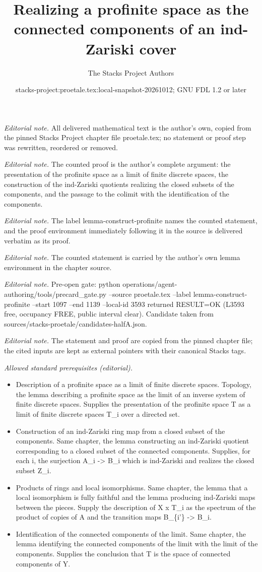\documentclass[10pt,a4paper]{amsart}
\title{Realizing a profinite space as the connected components of an ind-Zariski cover}
\author{The Stacks Project Authors}
\date{stacks-project:proetale.tex:local-snapshot-20261012; GNU FDL 1.2 or later}
\theoremstyle{plain}
\theoremstyle{definition}
\theoremstyle{remark}
\numberwithin{equation}{subsection}
\begin{document}
\maketitle
\noindent\textit{Editorial note.} All delivered mathematical text is the author's own, copied from the pinned Stacks Project chapter file proetale.tex; no statement or proof step was rewritten, reordered or removed.\par\medskip
\noindent\textit{Editorial note.} The counted proof is the author's complete argument: the presentation of the profinite space as a limit of finite discrete spaces, the construction of the ind-Zariski quotients realizing the closed subsets of the components, and the passage to the colimit with the identification of the components.\par\medskip
\noindent\textit{Editorial note.} The label lemma-construct-profinite names the counted statement, and the proof environment immediately following it in the source is delivered verbatim as its proof.\par\medskip
\noindent\textit{Editorial note.} The counted statement is carried by the author's own lemma environment in the chapter source.\par\medskip
\noindent\textit{Editorial note.} Pre-open gate: python operations/agent-authoring/tools/precard\_gate.py --source proetale.tex --label lemma-construct-profinite --start 1097 --end 1139 --local-id 3593 returned RESULT=OK (L3593 free, occupancy FREE, public interval clear). Candidate taken from sources/stacks-proetale/candidates-halfA.json.\par\medskip
\noindent\textit{Editorial note.} The statement and proof are copied from the pinned chapter file; the cited inputs are kept as external pointers with their canonical Stacks tags.\par\medskip
\noindent\textit{Allowed standard prerequisites (editorial).}\begin{itemize}
\item Description of a profinite space as a limit of finite discrete spaces. Topology, the lemma describing a profinite space as the limit of an inverse system of finite discrete spaces. Supplies the presentation of the profinite space T as a limit of finite discrete spaces T\_i over a directed set.
\item Construction of an ind-Zariski ring map from a closed subset of the components. Same chapter, the lemma constructing an ind-Zariski quotient corresponding to a closed subset of the connected components. Supplies, for each i, the surjection A\_i -> B\_i which is ind-Zariski and realizes the closed subset Z\_i.
\item Products of rings and local isomorphisms. Same chapter, the lemma that a local isomorphism is fully faithful and the lemma producing ind-Zariski maps between the pieces. Supply the description of X x T\_i as the spectrum of the product of copies of A and the transition maps B\_\{i'\} -> B\_i.
\item Identification of the connected components of the limit. Same chapter, the lemma identifying the connected components of the limit with the limit of the components. Supplies the conclusion that T is the space of connected components of Y.
\end{itemize}\medskip
\end{document}
